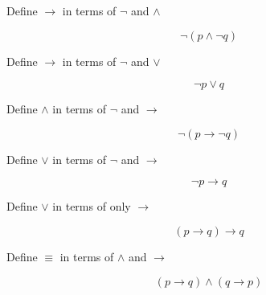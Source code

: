 \begin{problem}
Define $\rightarrow$ in terms of $\neg$ and $\land$

\ifKey
\color{red}
\hfill \begin{minipage}{0.5\textwidth}
$$\neg (p \land \neg q) $$
\end{minipage}
\color{black}
\fi
\end{problem}

\begin{problem}
Define $\rightarrow$ in terms of $\neg$ and $\lor$

\ifKey
\color{red}
\hfill \begin{minipage}{0.5\textwidth}
$$\neg p \lor q $$
\end{minipage}
\color{black}
\fi
\end{problem}

\begin{problem}
Define $\land$ in terms of $\neg$ and $\rightarrow$


\ifKey
\color{red}
\hfill \begin{minipage}{0.5\textwidth}
$$\neg(p \rightarrow \neg q) $$
\end{minipage}
\color{black}
\fi

\end{problem}

\begin{problem}
Define $\lor$ in terms of $\neg$ and $\rightarrow$


\ifKey
\color{red}
\hfill \begin{minipage}{0.5\textwidth}
$$\neg p\rightarrow q$$
\end{minipage}
\color{black}
\fi
\end{problem}


\begin{problem}
Define $\lor$ in terms of only $\rightarrow$


\ifKey
\color{red}
\hfill \begin{minipage}{0.5\textwidth}
$$ (p \rightarrow q )\rightarrow q$$
\end{minipage}
\color{black}
\fi
\end{problem}


\begin{problem}
Define $\equiv$ in terms of $\land$ and $\rightarrow$

\ifKey
\color{red}
\hfill \begin{minipage}{0.5\textwidth}
$$ (p \rightarrow q )\land (q \rightarrow p)$$
\end{minipage}
\color{black}
\fi

\end{problem}

